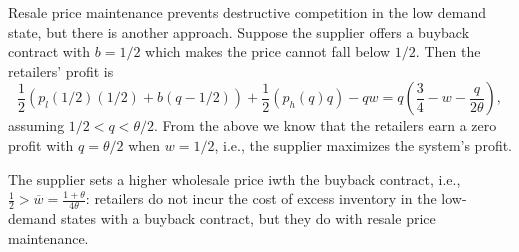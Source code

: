 Resale price maintenance prevents destructive competition in the low demand state, but there is another approach. Suppose the supplier offers a buyback contract with $b=1/2$ which makes the price cannot fall below $1/2$. Then the retailers' profit is 
\begin{equation*}
    \frac{1}{2}\left(p_l(1/2)(1/2)+b(q-1/2)\right)+\frac{1}{2}(p_h(q)q)-qw=q\left(\frac{3}{4}-w-\frac{q}{2\theta}\right),
\end{equation*} 
assuming $1/2<q<\theta/2$. From the above we know that the retailers earn a zero profit with $q=\theta/2$ when $w=1/2$, i.e., the supplier maximizes the system's profit.  
\begin{note}
    The supplier sets a higher wholesale price iwth the buyback contract, i.e., $\frac{1}{2}>\overline{w}=\frac{1+\theta}{4\theta}$: retailers do not incur the cost of excess inventory in the low-demand states with a buyback contract, but they do with resale price maintenance.
\end{note}






